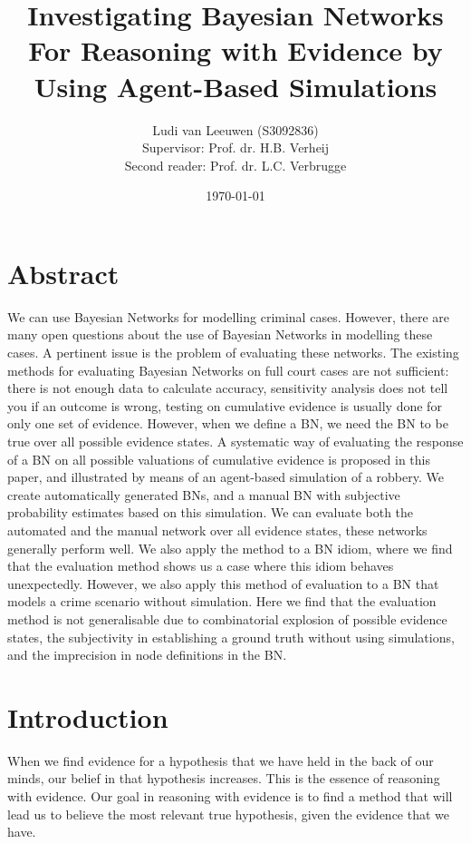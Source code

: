\documentclass[12pt]{article}
\title{Investigating Bayesian Networks For Reasoning with Evidence by Using Agent-Based Simulations}
\author{Ludi van Leeuwen   {\small (S3092836)} \\ [1cm]{\small Supervisor: Prof. dr. H.B. Verheij} \\  {\small Second reader: Prof. dr. L.C. Verbrugge}}
\date{\today}                                           %
\begin{document}
\maketitle
\newpage

\section*{Abstract}
We can use Bayesian Networks for modelling criminal cases. However, there are many open questions about the use of Bayesian Networks in modelling these cases. A pertinent issue is the problem of evaluating these networks. The existing methods for evaluating Bayesian Networks on full court cases are not sufficient: there is not enough data to calculate accuracy, sensitivity analysis does not tell you if an outcome is wrong, testing on cumulative evidence is usually done for only one set of evidence. However, when we define a BN, we need the BN to be true over all possible evidence states. A systematic way of evaluating the response of a BN on all possible valuations of cumulative evidence is proposed in this paper, and illustrated by means of an agent-based simulation of a robbery. We create automatically generated BNs, and a manual BN with subjective probability estimates based on this simulation. We can evaluate both the automated and the manual network over all evidence states, these networks generally perform well. We also apply the method to a BN idiom, where we find that the evaluation method shows us a case where this idiom behaves unexpectedly. However, we also apply this method of evaluation to a BN that models a crime scenario without simulation. Here we find that the evaluation method is not generalisable due to combinatorial explosion of possible evidence states, the subjectivity in establishing a ground truth without using simulations, and the imprecision in node definitions in the BN.

\newpage

\tableofcontents
\newpage

\section{Introduction}
When we find evidence for a hypothesis that we have held in the back of our minds, our belief in that hypothesis increases. This is the essence of reasoning with evidence. Our goal in reasoning with evidence is to find a method that will lead us to believe the most relevant true hypothesis, given the evidence that we have.
\end{document}

